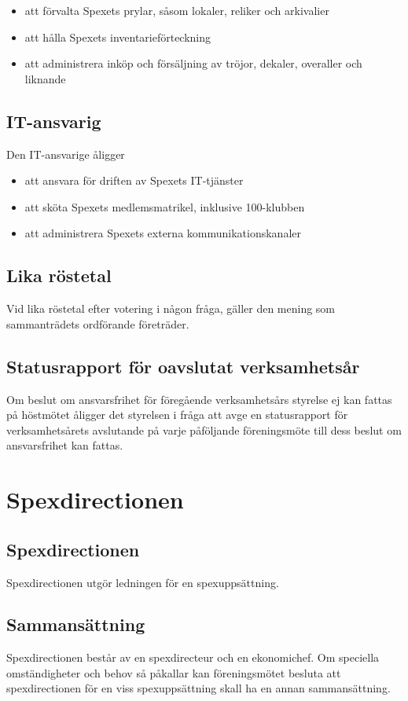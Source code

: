 \documentclass[a4paper]{article}
\begin{document}
\begin{itemize}
  \item att förvalta Spexets prylar, såsom lokaler, reliker och arkivalier
  \item att hålla Spexets inventarieförteckning
  \item att administrera inköp och försäljning av tröjor, dekaler, overaller och liknande
\end{itemize}

\subsection{IT-ansvarig}
Den IT-ansvarige åligger

\begin{itemize}
  \item att ansvara för driften av Spexets IT-tjänster
  \item att sköta Spexets medlemsmatrikel, inklusive 100-klubben
  \item att administrera Spexets externa kommunikationskanaler
\end{itemize}

\subsection{Lika röstetal}
Vid lika röstetal efter votering i någon fråga, gäller den mening som sammanträdets ordförande företräder.

\subsection{Statusrapport för oavslutat verksamhetsår}
Om beslut om ansvarsfrihet för föregående verksamhetsårs styrelse ej kan fattas på höstmötet åligger det styrelsen i fråga att avge en statusrapport för verksamhetsårets avslutande på varje påföljande föreningsmöte till dess beslut om ansvarsfrihet kan fattas.

\section{Spexdirectionen}
\label{section:spexdirectionen}

\subsection{Spexdirectionen}
Spexdirectionen utgör ledningen för en spexuppsättning.

\subsection{Sammansättning}
Spexdirectionen består av en spexdirecteur och en ekonomichef.\newline
\newline
Om speciella omständigheter och behov så påkallar kan föreningsmötet besluta att spexdirectionen för en viss spexuppsättning skall ha en annan sammansättning.
\end{document}
